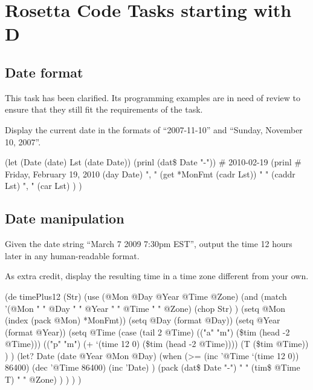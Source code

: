 %
%
%

\chapter{Rosetta Code Tasks starting with D}

\section*{Date format}


This task has been clarified. Its programming examples are in need of
review to ensure that they still fit the requirements of the task.

Display the current date in the formats of ``2007-11-10'' and ``Sunday,
November 10, 2007''.

\begin{wideverbatim}

(let (Date (date)  Lst (date Date))
   (prinl (dat\$ Date "-"))             # 2010-02-19
   (prinl                              # Friday, February 19, 2010
      (day Date)
      ", "
      (get *MonFmt (cadr Lst))
      " "
      (caddr Lst)
      ", "
      (car Lst) ) )

\end{wideverbatim}

\pagebreak{}
\section*{Date manipulation}

Given the date string ``March 7 2009 7:30pm EST'', output the time 12
hours later in any human-readable format.

As extra credit, display the resulting time in a time zone different
from your own.

\begin{wideverbatim}

(de timePlus12 (Str)
   (use (@Mon @Day @Year @Time @Zone)
      (and
         (match
            '(@Mon " " @Day " " @Year " " @Time " " @Zone)
            (chop Str) )
         (setq @Mon (index (pack @Mon) *MonFmt))
         (setq @Day (format @Day))
         (setq @Year (format @Year))
         (setq @Time
            (case (tail 2 @Time)
               (("a" "m") (\$tim (head -2 @Time)))
               (("p" "m") (+ `(time 12 0) (\$tim (head -2 @Time))))
               (T (\$tim @Time)) ) )
         (let? Date (date @Year @Mon @Day)
            (when (>= (inc '@Time `(time 12 0)) 86400)
               (dec '@Time 86400)
               (inc 'Date) )
            (pack (dat\$ Date "-") " " (tim\$ @Time T) " " @Zone) ) ) ) )

\end{wideverbatim}

